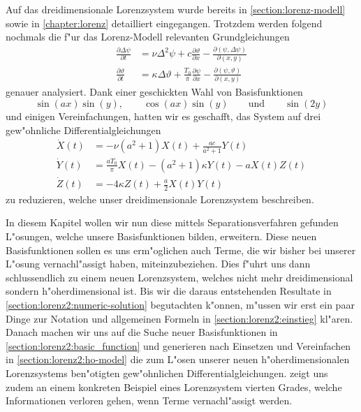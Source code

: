 Auf das dreidimensionale Lorenzsystem wurde bereits in 
\cref{section:lorenz-modell} sowie in \cref{chapter:lorenz} detailliert 
eingegangen. Trotzdem werden folgend nochmals die f"ur das Lorenz-Modell 
relevanten Grundgleichungen
\begin{equation}
	\begin{aligned}
	\frac{\partial\Delta\psi}{\partial t}
	&=
	\nu\Delta^2\psi 
	+c\frac{\partial\vartheta}{\partial x}
	-\frac{\partial(\psi,\Delta\psi)}{\partial(x,y)}
	\\
	\frac{\partial\vartheta}{\partial t}
	&=
	\kappa\Delta\vartheta
	+ \frac{T_0}{\pi}\frac{\partial\psi}{\partial x}
	- \frac{\partial(\psi,\vartheta)}{\partial(x,y)}
	\end{aligned}
	\label{equation:lorenz2:base}
\end{equation}
genauer analysiert. Dank einer geschickten Wahl von Basisfunktionen
\begin{equation*}
	\sin(ax)\sin(y),
	\qquad
	\cos(ax)\sin(y)
	\qquad\text{und}\qquad
	\sin(2y)
\end{equation*}
und einigen Vereinfachungen, hatten wir es geschafft, das System auf drei 
gew"ohnliche Differentialgleichungen
\begin{equation*}
	\begin{aligned}
	\dot X(t)
	&=
	-\nu(a^2+1)X(t)
	+\frac{ac}{a^2+1}Y(t)
	\\
	\dot Y(t)
	&=
	\frac{aT_0}{\pi}X(t)
	-(a^2+1)\kappa Y(t)
	-aX(t)Z(t)
	\\
	\dot Z(t)
	&=
	-4\kappa Z(t)
	+\frac{a}{2}X(t)Y(t)
	\end{aligned}
\end{equation*}
zu reduzieren, welche unser dreidimensionale Lorenzsystem beschreiben.

In diesem Kapitel wollen wir nun diese mittels Separationsverfahren gefunden 
L"osungen, welche unsere Basisfunktionen bilden, erweitern. Diese neuen 
Basisfunktionen sollen es uns erm"oglichen auch Terme, die wir bisher bei 
unserer L"osung vernachl"assigt haben, miteinzubeziehen. Dies f"uhrt uns dann 
schlussendlich zu einem neuen Lorenzsystem, welches nicht mehr 
dreidimensional sondern h"oherdimensional ist. Bis wir die daraus entstehenden 
Resultate in \cref{section:lorenz2:numeric-solution} begutachten k"onnen, 
m"ussen wir erst ein paar Dinge zur Notation und allgemeinen Formeln in 
\cref{section:lorenz2:einstieg} kl"aren. Danach machen wir uns auf die Suche 
neuer Basisfunktionen in \cref{section:lorenz2:basic_function} und generieren 
nach Einsetzen und Vereinfachen in \cref{section:lorenz2:ho-model} die zum 
L"osen unserer neuen h"oherdimensionalen Lorenzsystems ben"otigten 
gew"ohnlichen Differentialgleichungen.  
zeigt uns zudem an einem konkreten Beispiel eines Lorenzsystem vierten 
Grades, welche Informationen verloren gehen, wenn Terme vernachl"assigt werden.
